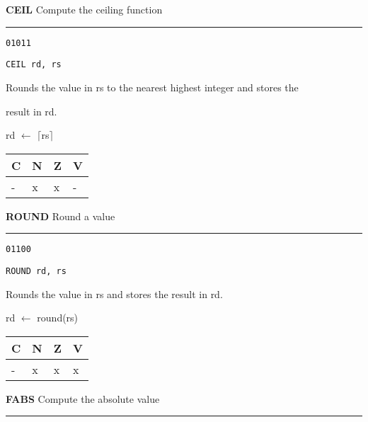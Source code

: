 \documentclass{article}
\begin{document}
\pagebreak

\flushleft
\LARGE\textbf{CEIL} \large \hfill Compute the ceiling function

\kern-3pt
\noindent\rule{16.5cm}{0.4pt}
\normalsize

{\large
	 \texttt{01011} \par
	\smallbreak
	 \texttt{CEIL rd, rs} \par
	\smallbreak
	 Rounds the value in rs to the nearest highest integer and stores the \par
	\makebox[3.5cm][l]{  } result in rd. \par
	\smallbreak
	 rd $\leftarrow$ $\lceil$rs$\rceil$ \par
	\smallbreak
	 \begin{tabular}{llll} C \quad & N \quad & Z \quad & V \\ \hline - & x & x & - \\ \end{tabular}
}

\bigskip\bigskip

\flushleft
\LARGE\textbf{ROUND} \large \hfill Round a value

\kern-3pt
\noindent\rule{16.5cm}{0.4pt}
\normalsize

{\large
	 \texttt{01100} \par
	\smallbreak
	 \texttt{ROUND rd, rs} \par
	\smallbreak
	 Rounds the value in rs and stores the result in rd. \par
	\smallbreak
	 rd $\leftarrow$ round(rs) \par
	\smallbreak
	 \begin{tabular}{llll} C \quad & N \quad & Z \quad & V \\ \hline - & x & x & x \\ \end{tabular}
}

\bigskip\bigskip

\flushleft
\LARGE\textbf{FABS} \large \hfill Compute the absolute value

\kern-3pt
\noindent\rule{16.5cm}{0.4pt}
\normalsize
\end{document}
